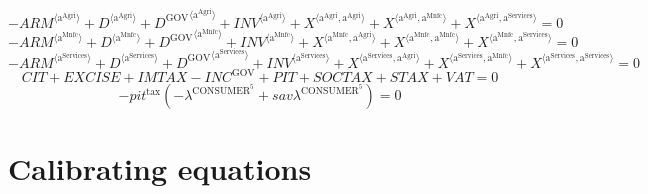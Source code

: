 \begin{equation}
-{{A\!R\!M}}^{\langle \mathrm{a}^{\mathrm{Agri}}\rangle} + {D}^{\langle \mathrm{a}^{\mathrm{Agri}}\rangle} + {D^{\mathrm{GOV}}}^{\langle \mathrm{a}^{\mathrm{Agri}}\rangle} + {{I\!N\!V}}^{\langle \mathrm{a}^{\mathrm{Agri}}\rangle} + {X}^{\langle \mathrm{a}^{\mathrm{Agri}},\mathrm{a}^{\mathrm{Agri}}\rangle} + {X}^{\langle \mathrm{a}^{\mathrm{Agri}},\mathrm{a}^{\mathrm{Mnfc}}\rangle} + {X}^{\langle \mathrm{a}^{\mathrm{Agri}},\mathrm{a}^{\mathrm{Services}}\rangle} = 0
\end{equation}
\begin{equation}
-{{A\!R\!M}}^{\langle \mathrm{a}^{\mathrm{Mnfc}}\rangle} + {D}^{\langle \mathrm{a}^{\mathrm{Mnfc}}\rangle} + {D^{\mathrm{GOV}}}^{\langle \mathrm{a}^{\mathrm{Mnfc}}\rangle} + {{I\!N\!V}}^{\langle \mathrm{a}^{\mathrm{Mnfc}}\rangle} + {X}^{\langle \mathrm{a}^{\mathrm{Mnfc}},\mathrm{a}^{\mathrm{Agri}}\rangle} + {X}^{\langle \mathrm{a}^{\mathrm{Mnfc}},\mathrm{a}^{\mathrm{Mnfc}}\rangle} + {X}^{\langle \mathrm{a}^{\mathrm{Mnfc}},\mathrm{a}^{\mathrm{Services}}\rangle} = 0
\end{equation}
\begin{equation}
-{{A\!R\!M}}^{\langle \mathrm{a}^{\mathrm{Services}}\rangle} + {D}^{\langle \mathrm{a}^{\mathrm{Services}}\rangle} + {D^{\mathrm{GOV}}}^{\langle \mathrm{a}^{\mathrm{Services}}\rangle} + {{I\!N\!V}}^{\langle \mathrm{a}^{\mathrm{Services}}\rangle} + {X}^{\langle \mathrm{a}^{\mathrm{Services}},\mathrm{a}^{\mathrm{Agri}}\rangle} + {X}^{\langle \mathrm{a}^{\mathrm{Services}},\mathrm{a}^{\mathrm{Mnfc}}\rangle} + {X}^{\langle \mathrm{a}^{\mathrm{Services}},\mathrm{a}^{\mathrm{Services}}\rangle} = 0
\end{equation}
\begin{equation}
{C\!I\!T} + {E\!X\!C\!I\!S\!E} + {I\!M\!T\!A\!X} - {I\!N\!C}^{\mathrm{GOV}} + {P\!I\!T} + {S\!O\!C\!T\!A\!X} + {S\!T\!A\!X} + {V\!A\!T} = 0
\end{equation}
\begin{equation}
-{{p\!i\!t}^{\mathrm{tax}}} \left(-\lambda^{\mathrm{CONSUMER}^{\mathrm{5}}} + {{s\!a\!v}} {\lambda^{\mathrm{CONSUMER}^{\mathrm{5}}}}\right) = 0
\end{equation}



\section{Calibrating equations}

